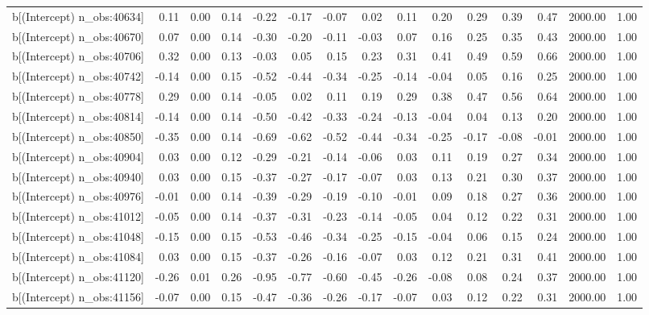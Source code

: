 \begin{table}[ht]
\begin{tabular}{rrrrrrrrrrrrrrr}
  b[(Intercept) n\_obs:40634] & 0.11 & 0.00 & 0.14 & -0.22 & -0.17 & -0.07 & 0.02 & 0.11 & 0.20 & 0.29 & 0.39 & 0.47 & 2000.00 & 1.00 \\ 
  b[(Intercept) n\_obs:40670] & 0.07 & 0.00 & 0.14 & -0.30 & -0.20 & -0.11 & -0.03 & 0.07 & 0.16 & 0.25 & 0.35 & 0.43 & 2000.00 & 1.00 \\ 
  b[(Intercept) n\_obs:40706] & 0.32 & 0.00 & 0.13 & -0.03 & 0.05 & 0.15 & 0.23 & 0.31 & 0.41 & 0.49 & 0.59 & 0.66 & 2000.00 & 1.00 \\ 
  b[(Intercept) n\_obs:40742] & -0.14 & 0.00 & 0.15 & -0.52 & -0.44 & -0.34 & -0.25 & -0.14 & -0.04 & 0.05 & 0.16 & 0.25 & 2000.00 & 1.00 \\ 
  b[(Intercept) n\_obs:40778] & 0.29 & 0.00 & 0.14 & -0.05 & 0.02 & 0.11 & 0.19 & 0.29 & 0.38 & 0.47 & 0.56 & 0.64 & 2000.00 & 1.00 \\ 
  b[(Intercept) n\_obs:40814] & -0.14 & 0.00 & 0.14 & -0.50 & -0.42 & -0.33 & -0.24 & -0.13 & -0.04 & 0.04 & 0.13 & 0.20 & 2000.00 & 1.00 \\ 
  b[(Intercept) n\_obs:40850] & -0.35 & 0.00 & 0.14 & -0.69 & -0.62 & -0.52 & -0.44 & -0.34 & -0.25 & -0.17 & -0.08 & -0.01 & 2000.00 & 1.00 \\ 
  b[(Intercept) n\_obs:40904] & 0.03 & 0.00 & 0.12 & -0.29 & -0.21 & -0.14 & -0.06 & 0.03 & 0.11 & 0.19 & 0.27 & 0.34 & 2000.00 & 1.00 \\ 
  b[(Intercept) n\_obs:40940] & 0.03 & 0.00 & 0.15 & -0.37 & -0.27 & -0.17 & -0.07 & 0.03 & 0.13 & 0.21 & 0.30 & 0.37 & 2000.00 & 1.00 \\ 
  b[(Intercept) n\_obs:40976] & -0.01 & 0.00 & 0.14 & -0.39 & -0.29 & -0.19 & -0.10 & -0.01 & 0.09 & 0.18 & 0.27 & 0.36 & 2000.00 & 1.00 \\ 
  b[(Intercept) n\_obs:41012] & -0.05 & 0.00 & 0.14 & -0.37 & -0.31 & -0.23 & -0.14 & -0.05 & 0.04 & 0.12 & 0.22 & 0.31 & 2000.00 & 1.00 \\ 
  b[(Intercept) n\_obs:41048] & -0.15 & 0.00 & 0.15 & -0.53 & -0.46 & -0.34 & -0.25 & -0.15 & -0.04 & 0.06 & 0.15 & 0.24 & 2000.00 & 1.00 \\ 
  b[(Intercept) n\_obs:41084] & 0.03 & 0.00 & 0.15 & -0.37 & -0.26 & -0.16 & -0.07 & 0.03 & 0.12 & 0.21 & 0.31 & 0.41 & 2000.00 & 1.00 \\ 
  b[(Intercept) n\_obs:41120] & -0.26 & 0.01 & 0.26 & -0.95 & -0.77 & -0.60 & -0.45 & -0.26 & -0.08 & 0.08 & 0.24 & 0.37 & 2000.00 & 1.00 \\ 
  b[(Intercept) n\_obs:41156] & -0.07 & 0.00 & 0.15 & -0.47 & -0.36 & -0.26 & -0.17 & -0.07 & 0.03 & 0.12 & 0.22 & 0.31 & 2000.00 & 1.00 \\ 

\end{tabular}
\end{table}
